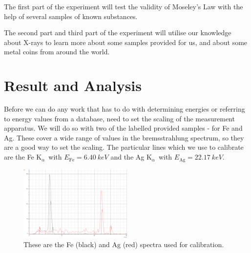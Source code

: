 \documentclass[11pt,a4paper,twoside,onecolumn]{article}
\newcommand{\Kalpha}{$\mathrm{K}_\alpha$~}
\begin{document}
The first part of the experiment will test the validity of Moseley's Law with the help of several samples of known substances.

The second part and third part of the experiment will utilise our knowledge about X-rays to learn more about some samples provided for us, and about some metal coins from around the world.

\section{Result and Analysis}
Before we can do any work that has to do with determining energies or referring to energy values from a database, need to set the scaling of the measurement apparatus. We will do so with two of the labelled provided samples - for Fe and Ag. These cover a wide range of values in the bremsstrahlung spectrum, so they are a good way to set the scaling. The particular lines which we use to calibrate are the Fe \Kalpha with $E_\mathrm{Fe} = \SI{6.40}{keV}$ and the Ag \Kalpha with $E_\mathrm{Ag} = \SI{22.17}{keV}$.

\begin{figure}[!htb]
    \centering
    \includegraphics[width=0.5\textwidth]{img/calib.png}
    \caption{These are the Fe (black) and Ag (red) spectra used for calibration.}\label{fig:calibration}
\end{figure}
\end{document}
